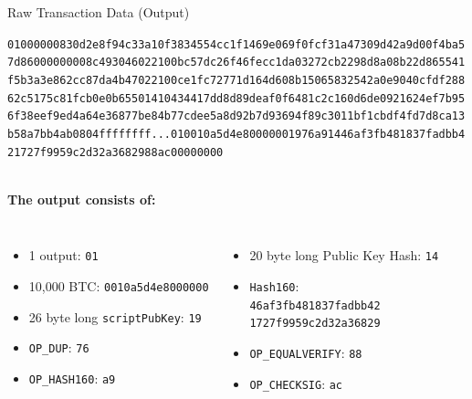 \documentclass[handout]{beamer}
\begin{document}
\begin{frame}{Raw Transaction Data (Output)}
\begin{scriptsize}
\texttt{\textcolor{black!30}{01000000830d2e8f94c33a10f3834554cc1f1469e069f0fcf31a47309d42a9d00f4ba5
7d86000000008c493046022100bc57dc26f46fecc1da03272cb2298d8a08b22d865541
f5b3a3e862cc87da4b47022100ce1fc72771d164d608b15065832542a0e9040cfdf288
62c5175c81fcb0e0b65501410434417dd8d89deaf0f6481c2c160d6de0921624ef7b95
6f38eef9ed4a64e36877be84b77cdee5a8d92b7d93694f89c3011bf1cbdf4fd7d8ca13
b58a7bb4ab0804ffffffff}\alert<1>{...}{\alert<2>{01}\alert<3>{0010a5d4e8000000}\alert<4>{19}\alert<5>{76}\alert<6>{a9}\alert<7>{14}\alert<8>{46af3fb481837fadbb4
21727f9959c2d32a36829}\alert<9>{88}\alert<10>{ac}}\textcolor{black!30}{00000000}}
\end{scriptsize}
\vspace{1em}
	\scriptsize \\
	\textbf{The output consists of:}\\
	\begin{columns}
	\begin{itemize}
		\item \alert<2>{1 output: \texttt{01}}
		\item \alert<3>{10,000 BTC: \texttt{0010a5d4e8000000}}
		\item \alert<4>{26 byte long \texttt{scriptPubKey}: \texttt{19}}
		\item \textcolor{black!50}{\alert<5>{\texttt{OP\_DUP}: \texttt{76}}}
		\item \textcolor{black!50}{\alert<6>{\texttt{OP\_HASH160}: \texttt{a9}}}
	\end{itemize}
	\begin{itemize}
		\item \alert<7>{20 byte long Public Key Hash: \texttt{14}}
		\item \alert<8>{\texttt{Hash160}:\\
		\texttt{46af3fb481837fadbb42\\1727f9959c2d32a36829}}
		\item \textcolor{black!50}{\alert<9>{\texttt{OP\_EQUALVERIFY}: \texttt{88}}}
		\item \textcolor{black!50}{\alert<10>{\texttt{OP\_CHECKSIG}: \texttt{ac}}}
	\end{itemize}
	\end{columns}
	\vspace{1em}
	\normalsize
	\\
\end{frame}
\end{document}
